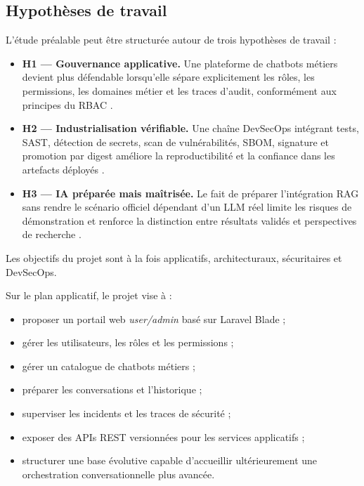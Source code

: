 \subsection{Hypothèses de travail}

L’étude préalable peut être structurée autour de trois hypothèses de travail :
\begin{itemize}
    \item \textbf{H1 — Gouvernance applicative.} Une plateforme de chatbots métiers devient plus défendable lorsqu’elle sépare explicitement les rôles, les permissions, les domaines métier et les traces d’audit, conformément aux principes du RBAC \cite{sandhu_rbac_1996}.
    \item \textbf{H2 — Industrialisation vérifiable.} Une chaîne DevSecOps intégrant tests, SAST, détection de secrets, scan de vulnérabilités, SBOM, signature et promotion par digest améliore la reproductibilité et la confiance dans les artefacts déployés \cite{nist_ssdf_800_218,slsa_spec_v1,cyclonedx_spec,sigstore_ccs_2022}.
    \item \textbf{H3 — IA préparée mais maîtrisée.} Le fait de préparer l’intégration RAG sans rendre le scénario officiel dépendant d’un LLM réel limite les risques de démonstration et renforce la distinction entre résultats validés et perspectives de recherche \cite{lewis_rag_2020,gao_rag_survey_2024}.
\end{itemize}



Les objectifs du projet sont à la fois applicatifs, architecturaux, sécuritaires et DevSecOps.

Sur le plan applicatif, le projet vise à :

\begin{itemize}
    \item proposer un portail web \textit{user/admin} basé sur Laravel Blade ;
    \item gérer les utilisateurs, les rôles et les permissions ;
    \item gérer un catalogue de chatbots métiers ;
    \item préparer les conversations et l’historique ;
    \item superviser les incidents et les traces de sécurité ;
    \item exposer des APIs REST versionnées pour les services applicatifs ;
    \item structurer une base évolutive capable d’accueillir ultérieurement une orchestration conversationnelle plus avancée.
\end{itemize}

